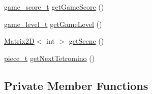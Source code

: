 \begin{DoxyCompactItemize}
\item 
\mbox{\hyperlink{structgame__score__t}{game\+\_\+score\+\_\+t}} \mbox{\hyperlink{classTetreesEngine_a46108b9a7ea4ab8ebd27323f9752e208}{get\+Game\+Score}} ()
\item 
\mbox{\hyperlink{structgame__level__t}{game\+\_\+level\+\_\+t}} \mbox{\hyperlink{classTetreesEngine_a7ad503b48ba753c446e5438ca67aa4e3}{get\+Game\+Level}} ()
\item 
\mbox{\hyperlink{classMatrix2D}{Matrix2D}}$<$ int $>$ \mbox{\hyperlink{classTetreesEngine_a1f167b42fc077d496449a2cc959989ac}{get\+Scene}} ()
\item 
\mbox{\hyperlink{structpiece__t}{piece\+\_\+t}} \mbox{\hyperlink{classTetreesEngine_a78698174a309f2a4d74da9fd47167f56}{get\+Next\+Tetromino}} ()
\end{DoxyCompactItemize}
\subsection*{Private Member Functions}
